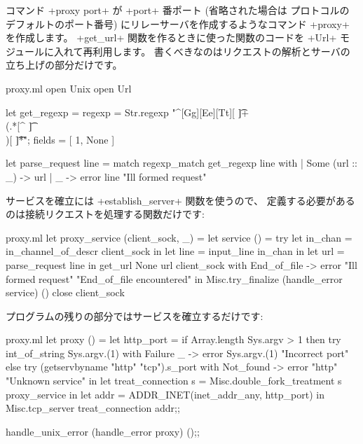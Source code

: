 コマンド \ml+proxy port+ が \ml+port+ 番ポート (省略された場合は \http プロトコルの
デフォルトのポート番号) にリレーサーバを作成するようなコマンド \ml+proxy+ を作成します。
\ml+get_url+ 関数を作るときに使った関数のコードを \ml+Url+ モジュールに入れて再利用します。
書くべきなのはリクエストの解析とサーバの立ち上げの部分だけです。
%
\begin{listingcodefile}{proxy.ml}
open Unix
open Url

let get_regexp =
  { regexp = Str.regexp "^[Gg][Ee][Tt][ \t]+\\(.*[^ \t]\\)[ \t]*\r";
    fields = [ 1, None ] }

let parse_request line = match regexp_match get_regexp line with
  | Some (url :: _) -> url
  | _ -> error line "Ill formed request"
\end{listingcodefile}
%
サービスを確立には \ml+establish_server+ 関数を使うので、
定義する必要があるのは接続リクエストを処理する関数だけです:
%
\begin{listingcodefile}{proxy.ml}
let proxy_service (client_sock, _) =
  let service () =
    try
      let in_chan = in_channel_of_descr client_sock in
      let line = input_line in_chan in
      let url = parse_request line in
      get_url None url client_sock
    with End_of_file ->
      error "Ill formed request" "End_of_file encountered"
  in
  Misc.try_finalize
    (handle_error service) ()
    close client_sock
\end{listingcodefile}
\label{page/get_url}
%
プログラムの残りの部分ではサービスを確立するだけです:
%
\begin{listingcodefile}{proxy.ml}
let proxy () =
  let http_port =
    if Array.length Sys.argv > 1 then
      try int_of_string Sys.argv.(1)
      with Failure _ -> error Sys.argv.(1) "Incorrect port"
    else
      try (getservbyname "http" "tcp").s_port
      with Not_found -> error "http" "Unknown service"
  in
  let treat_connection s = Misc.double_fork_treatment s proxy_service in
  let addr = ADDR_INET(inet_addr_any, http_port) in
  Misc.tcp_server treat_connection addr;;

handle_unix_error (handle_error proxy) ();;
\end{listingcodefile}

